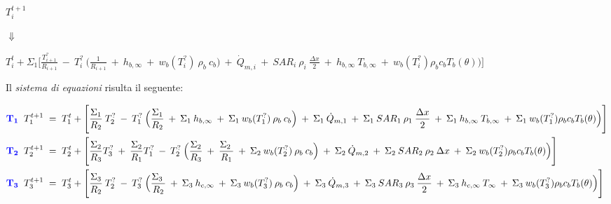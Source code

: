 \begin{center}
	$T_i ^{t+1}$
	\begin{center}
		\begin{center}
			$\Downarrow$
		\end{center}
	\end{center}
	$T_i ^t + \Sigma_1 \Bigg[ \frac{T_{i+1}^?}{R_{i+1}} \:-\: T_i ^? \:\Big(\frac{1}{R_{i+1}} \:+\: h_{b, \infty} \:+\:  w_b (T_i^?) \: \rho _b \: c_b  \Big) \:+\: \Dot{Q}_{m,i} \:+\: SAR_i \: \rho_i \: \frac{\Delta x}{2} \:+\: h_{b, \infty} \: T_{b, \infty} \:+\:  w_b (T_i^?) \rho _b c_b T_b(\theta)\Big) \Bigg]$
\end{center}

\vspace{1cm}

\noindent
Il \textit{sistema di equazioni} risulta il seguente:\\

\hspace{-2.5cm}
\begin{minipage}{\textwidth}
	{\footnotesize
	\begin{align*}
		\mbox{\textcolor{blue}{$\mathbf{T_{1}}$}} \;\;
		T_{1}^{t+1} \;&=\; T_1 ^t + \Bigg[ \frac{\Sigma_1}{R_{2}}  \: T_{2}^? \:-\: T_1 ^? \:\Big(\frac{\Sigma_1}{R_{2}} \:+\:\Sigma_1 \: h_{b, \infty} \:+\:  \Sigma_1 \: w_b (T_1^?) \: \rho _b \: c_b  \Big) \:+\: \Sigma_1 \:\Dot{Q}_{m,1} \:+\: \Sigma_1 \: SAR_1 \: \rho_1 \: \frac{\Delta x}{2} \:+\: \Sigma_1 \: h_{b, \infty} \: T_{b, \infty} \:+\: \Sigma_1 \:  w_b (T_1^?) \rho _b c_b T_b(\theta)\Big) \Bigg] \\
		\mbox{\textcolor{blue}{$\mathbf{T_{2}}$}} \;\;
		T_{2}^{t+1} \;&=\; T_2 ^t + \Bigg[ \frac{\Sigma_2 }{R_{3}}T_{3}^? \:+\: \frac{\Sigma_2 }{R_{1}}T_{1}^? \:-\: T_2 ^? \:\Big(\frac{\Sigma_2}{R_{3}} \:+\: \frac{\Sigma_2 \:}{R_{1}} \:+\:  \Sigma_2 \:w_b (T_2^?) \: \rho _b \: c_b  \Big) \:+\: \Sigma_2 \:\Dot{Q}_{m,2} \:+\: \Sigma_2 \:SAR_2 \: \rho_2 \: \Delta x \:+\:  \Sigma_2 \: w_b (T_2^?) \rho _b c_b T_b(\theta)\Big) \Bigg]\\
		\mbox{\textcolor{blue}{$\mathbf{T_{3}}$}} \;\;
		T_{3}^{t+1} \;&=\; T_3 ^t + \Bigg[ \frac{\Sigma_3}{R_{2}}\: T_{2}^? \:-\: T_3 ^? \:\Big(\frac{\Sigma_3\: }{R_{2}} \:+\: \Sigma_3\: h_{c, \infty} \:+\:  \Sigma_3\: w_b (T_3^?) \: \rho _b \: c_b  \Big) \:+\: \Sigma_3\: \Dot{Q}_{m,3} \:+\: \Sigma_3\: SAR_3 \: \rho_3 \: \frac{\Delta x}{2} \:+\: \Sigma_3\: h_{c, \infty} \: T_{\infty} \:+\:  \Sigma_3\: w_b (T_3^?) \rho _b c_b T_b(\theta)\Big) \Bigg] \\
	\end{align*}
	}
\end{minipage}




